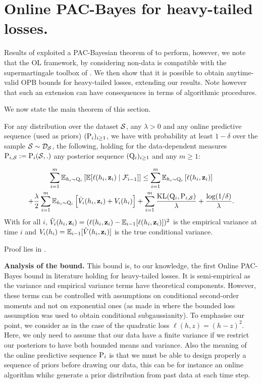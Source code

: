 \section{Online PAC-Bayes for heavy-tailed losses.}
\label{sec: heavy-tailed}

Results of  exploited a PAC-Bayesian theorem of \citet{rivasplata2020pac} to perform, however, we note that the OL framework, by considering non-\iid data is compatible with the supermartingale toolbox of . We then show that it is possible to obtain anytime-valid OPB bounds for heavy-tailed losses, extending our results. Note however that such an extension can have consequences in terms of algorithmic procedures.

We now state the main theorem of this section.

\begin{theorem}
  \label{th: opb-ht}
  For any distribution over the dataset $\S$, any $\lambda>0$ and any online predictive sequence (used as priors) $(\P_{i})_{i\geq 1}$, we have with probability at least $1-\delta$ over the sample $\S\sim\D_{\S}$, the following, holding for the data-dependent measures $\P_{i,\S}:= \P_{i}(\S,.)$ any posterior sequence $(\Q_{i})_{i\geq 1}$ and any $m\geq 1$:

  \begin{multline*}
     \sum_{i=1}^m \mathbb{E}_{h_i\sim \Q_{i}}\left[ \mathbb{E}[\ell(h_i,\z_i) \mid \mathcal{F}_{i-1}]    \right]  \leq \sum_{i=1}^m \mathbb{E}_{h_i\sim \Q_{i}}\left[ \ell(h_i,\z_i) \right] \\+\frac{\lambda}{2}\sum_{i=1}^m \mathbb{E}_{h_i\sim \Q_{i}}\left[ \hat{V}_i(h_i,\z_i) + V_i(h_i) \right]
     + \sum_{i=1}^m\frac{\operatorname{KL}(\Q_{i}, \P_{i,\S})}{\lambda}  + \frac{\log(1/\delta)}{\lambda}.
  \end{multline*}
  With for all $i$, $\hat{V}_i(h_i,\z_i)= (\ell(h_i,\z_i)-\mathbb{E}_{i-1}[\ell(h_i,\z_i)])^2$ is the empirical variance at time $i$ and $V_i(h_i)= \mathbb{E}_{i-1}[\hat{V}(h_i,\z_i)]$ is the true conditional variance.
\end{theorem}

Proof lies in .

\textbf{Analysis of the bound.} This bound is, to our knowledge, the first Online PAC-Bayes bound in literature holding for heavy-tailed losses. It is semi-empirical as the variance and empirical variance terms have theoretical components. However, these terms can be controlled with assumptions on conditional second-order moments and not on exponential ones (as made in  where the bounded loss assumption was used to obtain conditional subgaussianity). To emphasise our point, we consider as in  the case of the quadratic loss $\ell(h,z)= (h-z)^2$. Here, we only need to assume that our data have a finite variance if we restrict our posteriors to have both bounded means and variance. Also the meaning of the online predictive sequence $\P_{i}$ is that we must be able to design properly a sequence of priors before drawing our data, this can be for instance an online algorithm whihc generate a prior distribution from past data at each time step.

